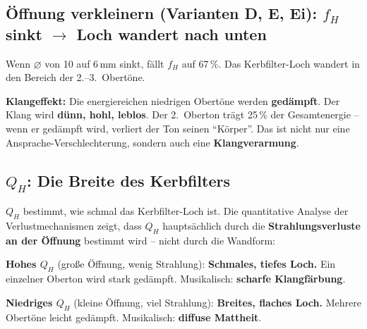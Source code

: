 \documentclass[11pt,a4paper]{article}
\begin{document}
\subsection{Öffnung verkleinern (Varianten D, E, Ei): $f_H$ sinkt $\to$ Loch wandert nach unten}

Wenn $\varnothing$ von 10 auf 6\,mm sinkt, fällt $f_H$ auf 67\,\%. Das Kerbfilter-Loch wandert in den Bereich der 2.--3.~Obertöne.

\textbf{Klangeffekt:} Die energiereichen niedrigen Obertöne werden \textbf{gedämpft}. Der Klang wird \textbf{dünn, hohl, leblos}. Der 2.~Oberton trägt 25\,\% der Gesamtenergie -- wenn er gedämpft wird, verliert der Ton seinen ``Körper''. Das ist nicht nur eine Ansprache-Verschlechterung, sondern auch eine \textbf{Klangverarmung}.

\subsection{$Q_H$: Die Breite des Kerbfilters}

$Q_H$ bestimmt, wie schmal das Kerbfilter-Loch ist. Die quantitative Analyse der Verlustmechanismen zeigt, dass $Q_H$ hauptsächlich durch die \textbf{Strahlungsverluste an der Öffnung} bestimmt wird -- nicht durch die Wandform:

\begin{table}[H]
\centering\footnotesize
{}
\caption{Zerlegung von $Q_H$. Wandform ändert $Q_\text{visc}$ um $\pm 5$--$10\,\%$ (Fläche), was $Q_\text{total}$ um maximal $\pm 3\,\%$ (Diskant) bis $\pm 7\,\%$ (Bass) verschiebt -- nicht hörbar.}
\end{table}

\textbf{Hohes $Q_H$} (große Öffnung, wenig Strahlung): \textbf{Schmales, tiefes Loch.} Ein einzelner Oberton wird stark gedämpft. Musikalisch: \textbf{scharfe Klangfärbung}.

\textbf{Niedriges $Q_H$} (kleine Öffnung, viel Strahlung): \textbf{Breites, flaches Loch.} Mehrere Obertöne leicht gedämpft. Musikalisch: \textbf{diffuse Mattheit}.
\end{document}
